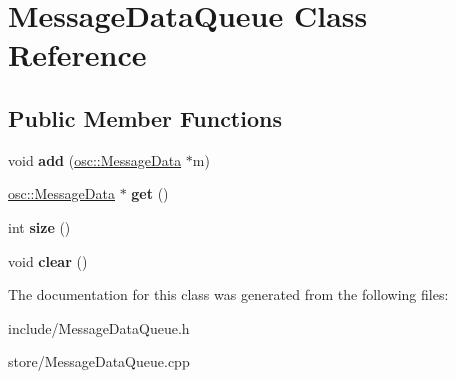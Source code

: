 \hypertarget{classMessageDataQueue}{\section{Message\-Data\-Queue Class Reference}
\label{classMessageDataQueue}
}
\subsection*{Public Member Functions}
\begin{DoxyCompactItemize}
\item 
\hypertarget{classMessageDataQueue_a8d2d0c5e6b879c240a5845b2c789c130}{void {\bfseries add} (\hyperlink{classosc_1_1MessageData}{osc\-::\-Message\-Data} $\ast$m)}\label{classMessageDataQueue_a8d2d0c5e6b879c240a5845b2c789c130}

\item 
\hypertarget{classMessageDataQueue_ae1829552864a18207ca556edcb82a76d}{\hyperlink{classosc_1_1MessageData}{osc\-::\-Message\-Data} $\ast$ {\bfseries get} ()}\label{classMessageDataQueue_ae1829552864a18207ca556edcb82a76d}

\item 
\hypertarget{classMessageDataQueue_a6f7619c03371e76b95a2c2d348da866d}{int {\bfseries size} ()}\label{classMessageDataQueue_a6f7619c03371e76b95a2c2d348da866d}

\item 
\hypertarget{classMessageDataQueue_a565232895a0e0cc0416715aedf2e5e21}{void {\bfseries clear} ()}\label{classMessageDataQueue_a565232895a0e0cc0416715aedf2e5e21}

\end{DoxyCompactItemize}


The documentation for this class was generated from the following files\-:\begin{DoxyCompactItemize}
\item 
include/Message\-Data\-Queue.\-h\item 
store/Message\-Data\-Queue.\-cpp\end{DoxyCompactItemize}

